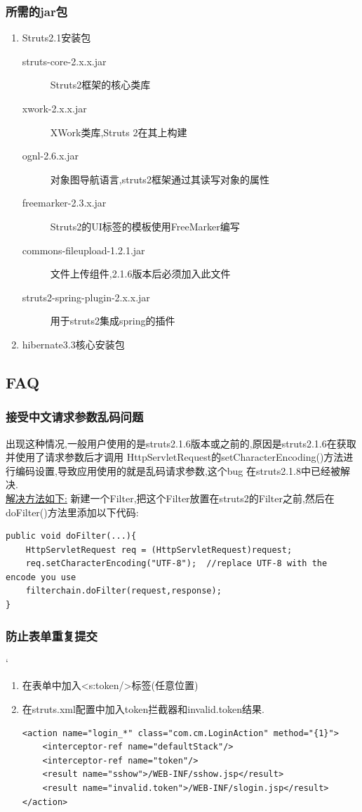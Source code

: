 \subsubsection{所需的jar包}
\begin{enumerate}
\item Struts2.1安装包
\begin{description}
\item[struts-core-2.x.x.jar]	Struts2框架的核心类库
\item[xwork-2.x.x.jar]	XWork类库,Struts 2在其上构建
\item[ognl-2.6.x.jar]	对象图导航语言,struts2框架通过其读写对象的属性
\item[freemarker-2.3.x.jar]	Struts2的UI标签的模板使用FreeMarker编写
\item[commons-fileupload-1.2.1.jar]	文件上传组件,2.1.6版本后必须加入此文件 
\item[struts2-spring-plugin-2.x.x.jar]	用于struts2集成spring的插件 
\end{description}

\item hibernate3.3核心安装包

\end{enumerate}



\subsection{FAQ}
\subsubsection{接受中文请求参数乱码问题}
出现这种情况,一般用户使用的是struts2.1.6版本或之前的,原因是struts2.1.6在获取并使用了请求参数后才调用
HttpServletRequest的setCharacterEncoding()方法进行编码设置,导致应用使用的就是乱码请求参数,这个bug
在struts2.1.8中已经被解决.\\
\underline{解决方法如下:}
新建一个Filter,把这个Filter放置在struts2的Filter之前,然后在doFilter()方法里添加以下代码:
\begin{lstlisting}[style=JAVA]
public void doFilter(...){
	HttpServletRequest req = (HttpServletRequest)request;
	req.setCharacterEncoding("UTF-8");	//replace UTF-8 with the encode you use
	filterchain.doFilter(request,response);
}
\end{lstlisting} 

\subsubsection{防止表单重复提交}`	
\begin{enumerate}
\item 在表单中加入<s:token/>标签(任意位置)
\item 在struts.xml配置中加入token拦截器和invalid.token结果.
\begin{lstlisting}[style=JAVA]
<action name="login_*" class="com.cm.LoginAction" method="{1}">
	<interceptor-ref name="defaultStack"/>
	<interceptor-ref name="token"/>
	<result name="sshow">/WEB-INF/sshow.jsp</result>
	<result name="invalid.token">/WEB-INF/slogin.jsp</result>
</action>
\end{lstlisting} 

\end{enumerate}